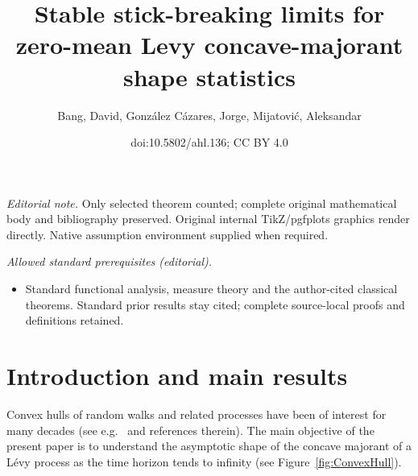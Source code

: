 \documentclass[10pt]{amsart}
\title{Stable stick-breaking limits for zero-mean Levy concave-majorant shape statistics}
\author{Bang, David, González Cázares, Jorge, Mijatović, Aleksandar}
\date{doi:10.5802/ahl.136; CC BY 4.0}
\theoremstyle{definition}\newtheorem{defi}[theo]{Definition}\newtheorem{rema}[theo]{Remark}\newtheorem{exam}[theo]{Example}\newtheorem{exem}[theo]{Example}\newtheorem{nota}[theo]{Notation}
\newcommand\1{\mathds{1}}
\begin{document}
\maketitle
\noindent\textit{Editorial note.} Only selected theorem counted; complete original mathematical body and bibliography preserved. Original internal TikZ/pgfplots graphics render directly. Native assumption environment supplied when required.\par\medskip
\noindent\textit{Allowed standard prerequisites (editorial).}\begin{itemize}
\item Standard functional analysis, measure theory and the author-cited classical theorems. Standard prior results stay cited; complete source-local proofs and definitions retained.
\end{itemize}\medskip


\section{Introduction and main results}\label{sec:intro}
Convex hulls of random walks and related processes have been of interest for many decades (see e.g.~\cite{RWpaper,MR2898714,MR3564216,MR3896868,MR2978134,randonfurling2020convex} and references therein). The main objective of the present paper is to understand the asymptotic shape of the concave majorant of a Lévy process as the time horizon tends to infinity (see Figure~\ref{fig:ConvexHull}).
\end{document}
